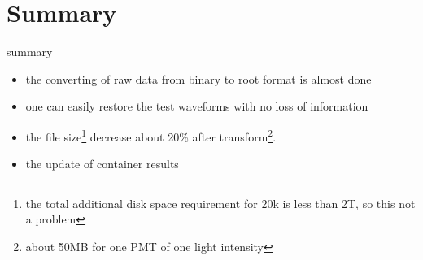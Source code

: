 \section{Summary}

\begin{frame}{summary}
\begin{itemize}
\item the converting of raw data from binary to root format is almost done  
\item one can easily restore the test waveforms with no loss of information
\item  the file size\footnote{the total additional disk space requirement for 20k is less than 2T, so this not a problem} decrease about 20\% after transform\footnote{about 50MB for one PMT of one light intensity}.
\item the update of container results
\end{itemize}
\end{frame}

\begin{frame}
\end{frame}

\begin{frame}
\end{frame}


